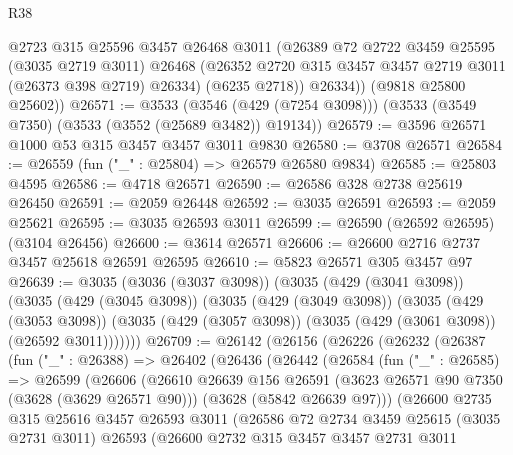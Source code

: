 \begin{lexlean}{R38}
\begin{coremodule}
          @2723
          @315
          @25596
          @3457
          @26468
          @3011
          (@26389
            @72
            @2722
            @3459
            @25595
            (@3035 @2719 @3011)
            @26468
            (@26352 @2720 @315 @3457 @3457 @2719 @3011 (@26373 @398 @2719) @26334)
            (@6235 @2718))
          @26334))
      (@9818 @25800 @25602))
@26571 := @3533
    (@3546 (@429 (@7254 @3098)))
    (@3533 (@3549 @7350) (@3533 (@3552 (@25689 @3482)) @19134))
@26579 := @3596 @26571 @1000 @53 @315 @3457 @3457 @3011 @9830
@26580 := @3708 @26571
@26584 := @26559 (fun ("_" : @25804) => @26579 @26580 @9834)
@26585 := @25803 @4595
@26586 := @4718 @26571
@26590 := @26586 @328 @2738 @25619 @26450
@26591 := @2059 @26448
@26592 := @3035 @26591
@26593 := @2059 @25621
@26595 := @3035 @26593 @3011
@26599 := @26590 (@26592 @26595) (@3104 @26456)
@26600 := @3614 @26571
@26606 := @26600 @2716 @2737 @3457 @25618 @26591 @26595
@26610 := @5823 @26571 @305 @3457 @97
@26639 := @3035
    (@3036 (@3037 @3098))
    (@3035
      (@429 (@3041 @3098))
      (@3035
        (@429 (@3045 @3098))
        (@3035
          (@429 (@3049 @3098))
          (@3035
            (@429 (@3053 @3098))
            (@3035 (@429 (@3057 @3098)) (@3035 (@429 (@3061 @3098)) (@26592 @3011)))))))
@26709 := @26142
    (@26156
      (@26226
        (@26232
          (@26387
            (fun ("_" : @26388) =>
            @26402
              (@26436
                (@26442
                  (@26584
                    (fun ("_" : @26585) =>
                    @26599
                      (@26606
                        (@26610
                          @26639
                          @156
                          @26591
                          (@3623 @26571 @90 @7350 (@3628 (@3629 @26571 @90)))
                          (@3628 (@5842 @26639 @97)))
                        (@26600
                          @2735
                          @315
                          @25616
                          @3457
                          @26593
                          @3011
                          (@26586
                            @72
                            @2734
                            @3459
                            @25615
                            (@3035 @2731 @3011)
                            @26593
                            (@26600
                              @2732
                              @315
                              @3457
                              @3457
                              @2731
                              @3011

\end{coremodule}
\end{lexlean}
